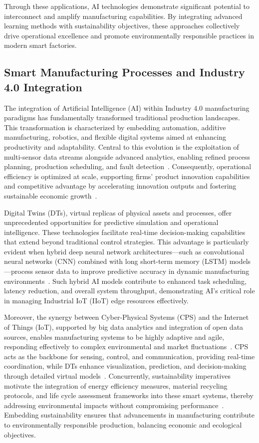 \documentclass[sigconf]{acmart}
\begin{document}
Through these applications, AI technologies demonstrate significant potential to interconnect and amplify manufacturing capabilities. By integrating advanced learning methods with sustainability objectives, these approaches collectively drive operational excellence and promote environmentally responsible practices in modern smart factories.

\subsection{Smart Manufacturing Processes and Industry 4.0 Integration}

The integration of Artificial Intelligence (AI) within Industry 4.0 manufacturing paradigms has fundamentally transformed traditional production landscapes. This transformation is characterized by embedding automation, additive manufacturing, robotics, and flexible digital systems aimed at enhancing productivity and adaptability. Central to this evolution is the exploitation of multi-sensor data streams alongside advanced analytics, enabling refined process planning, production scheduling, and fault detection~\cite{ref6,ref7,ref33,ref35}. Consequently, operational efficiency is optimized at scale, supporting firms’ product innovation capabilities and competitive advantage by accelerating innovation outputs and fostering sustainable economic growth~\cite{ref20}.   

Digital Twins (DTs), virtual replicas of physical assets and processes, offer unprecedented opportunities for predictive simulation and operational intelligence. These technologies facilitate real-time decision-making capabilities that extend beyond traditional control strategies. This advantage is particularly evident when hybrid deep neural network architectures—such as convolutional neural networks (CNN) combined with long short-term memory (LSTM) models—process sensor data to improve predictive accuracy in dynamic manufacturing environments~\cite{ref31,ref33,ref35}. Such hybrid AI models contribute to enhanced task scheduling, latency reduction, and overall system throughput, demonstrating AI’s critical role in managing Industrial IoT (IIoT) edge resources effectively.

Moreover, the synergy between Cyber-Physical Systems (CPS) and the Internet of Things (IoT), supported by big data analytics and integration of open data sources, enables manufacturing systems to be highly adaptive and agile, responding effectively to complex environmental and market fluctuations~\cite{ref9,ref20,ref22}. CPS acts as the backbone for sensing, control, and communication, providing real-time coordination, while DTs enhance visualization, prediction, and decision-making through detailed virtual models~\cite{ref22}. Concurrently, sustainability imperatives motivate the integration of energy efficiency measures, material recycling protocols, and life cycle assessment frameworks into these smart systems, thereby addressing environmental impacts without compromising performance~\cite{ref38,ref41}. Embedding sustainability ensures that advancements in manufacturing contribute to environmentally responsible production, balancing economic and ecological objectives.
\end{document}
